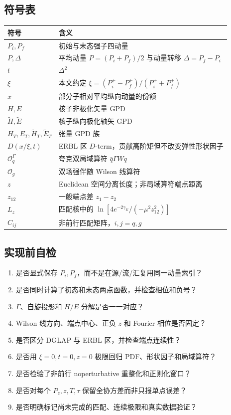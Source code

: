 \documentclass[12pt,a4paper]{ctexart}
\theoremstyle{definition}
\begin{document}
\subsection{符号表}

\begin{longtable}{p{3.2cm}p{10.5cm}}
\toprule
符号 & 含义 \\
\midrule
\endhead
$P_i,P_f$ & 初始与末态强子四动量 \\
$P,\Delta$ & 平均动量 $P=(P_i+P_f)/2$ 与动量转移 $\Delta=P_f-P_i$ \\
$t$ & $\Delta^2$ \\
$\xi$ & 本文约定 $\xi=(P_i^+-P_f^+)/(P_i^++P_f^+)$ \\
$x$ & 部分子相对平均纵向动量的份额 \\
$H,E$ & 核子非极化矢量 GPD \\
$\widetilde H,\widetilde E$ & 核子纵向极化轴矢 GPD \\
$H_T,E_T,\widetilde H_T,\widetilde E_T$ & 张量 GPD 族 \\
$D(x/\xi,t)$ & ERBL 区 $D$-term，贡献高阶矩但不改变弹性形状因子 \\
$\mathcal O_q^{\Gamma}$ & 夸克双局域算符 $\bar q\Gamma Wq$ \\
$\mathcal O_g$ & 双场强伴随 Wilson 线算符 \\
$z$ & Euclidean 空间分离长度；非局域算符端点距离 \\
$z_{12}$ & 一般端点差 $z_1-z_2$ \\
$L_z$ & 匹配核中的 $\ln[4e^{-2\gamma_E}/(-\mu^2z_{12}^2)]$ \\
$C_{ij}$ & 非前行匹配矩阵，$i,j=q,g$ \\
\bottomrule
\end{longtable}

\subsection{实现前自检}

\begin{enumerate}[leftmargin=*]
  \item 是否显式保存 $P_i,P_f$，而不是在源/流/汇复用同一动量索引？
  \item 是否同时计算了初态和末态两点函数，并检查相位和负号？
  \item $\Gamma$、自旋投影和 $H/E$ 分解是否一一对应？
  \item Wilson 线方向、端点中心、正负 $z$ 和 Fourier 相位是否固定？
  \item 是否区分 DGLAP 与 ERBL 区，并检查端点连续性？
  \item 是否用 $\xi=0,t=0,z=0$ 极限回归 PDF、形状因子和局域算符？
  \item 是否检验了非前行 noperturbative 重整化和正则化窗口？
  \item 是否对每个 $P_z,z,T,\tau$ 保留全协方差而非只报单点误差？
  \item 是否明确标记尚未完成的匹配、连续极限和真实数据验证？
\end{enumerate}
\end{document}
